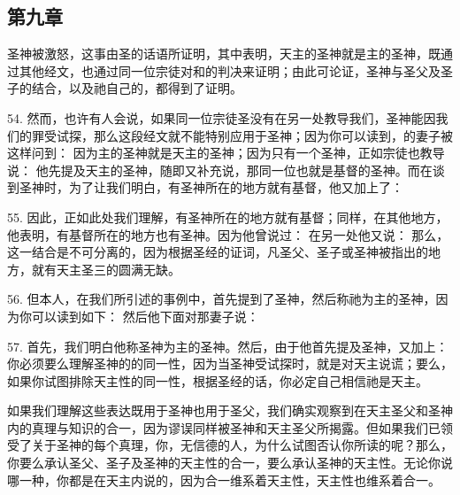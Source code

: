 \subsection{第九章}

圣神被激怒，这事由圣的话语所证明，其中表明，天主的圣神就是主的圣神，既通过其他经文，也通过同一位宗徒对和的判决来证明；由此可论证，圣神与圣父及圣子的结合，以及祂自己的，都得到了证明。\par

54. 然而，也许有人会说，如果同一位宗徒圣没有在另一处教导我们，圣神能因我们的罪受试探，那么这段经文就不能特别应用于圣神；因为你可以读到，的妻子被这样问到： 因为主的圣神就是天主的圣神；因为只有一个圣神，正如宗徒也教导说： 他先提及天主的圣神，随即又补充说，那同一位也就是基督的圣神。而在谈到圣神时，为了让我们明白，有圣神所在的地方就有基督，他又加上了：\par

55. 因此，正如此处我们理解，有圣神所在的地方就有基督；同样，在其他地方，他表明，有基督所在的地方也有圣神。因为他曾说过： 在另一处他又说： 那么，这一结合是不可分离的，因为根据圣经的证词，凡圣父、圣子或圣神被指出的地方，就有天主圣三的圆满无缺。\par

56. 但本人，在我们所引述的事例中，首先提到了圣神，然后称祂为主的圣神，因为你可以读到如下： 然后他下面对那妻子说：\par

57. 首先，我们明白他称圣神为主的圣神。然后，由于他首先提及圣神，又加上： 你必须要么理解圣神的的同一性，因为当圣神受试探时，就是对天主说谎；要么，如果你试图排除天主性的同一性，根据圣经的话，你必定自己相信祂是天主。\par

如果我们理解这些表达既用于圣神也用于圣父，我们确实观察到在天主圣父和圣神内的真理与知识的合一，因为谬误同样被圣神和天主圣父所揭露。但如果我们已领受了关于圣神的每个真理，你，无信德的人，为什么试图否认你所读的呢？那么，你要么承认圣父、圣子及圣神的天主性的合一，要么承认圣神的天主性。无论你说哪一种，你都是在天主内说的，因为合一维系着天主性，天主性也维系着合一。\par

